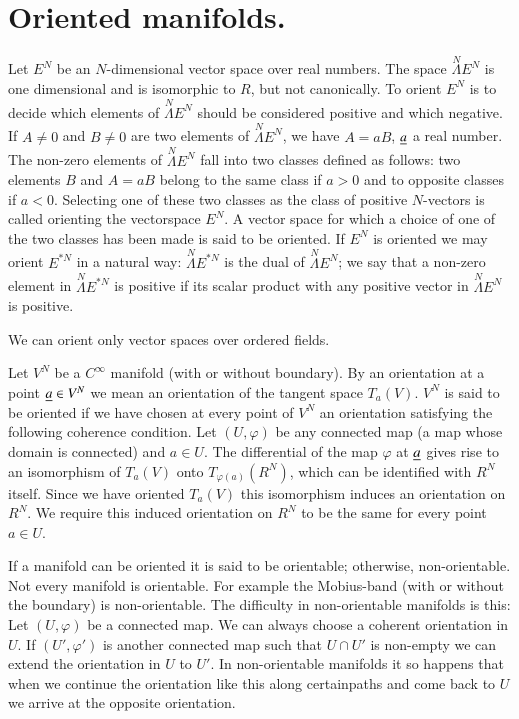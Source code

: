 \section*{Oriented manifolds.}

Let $E^{N}$ be an $N$-dimensional vector space over real numbers. The
space $\overset{N}{\Lambda}E^{N}$ is one dimensional and is isomorphic
to $R$, but not canonically. To orient $E^{N}$ is to decide which
elements of $\overset{N}{\Lambda}E^{N}$ should be considered positive
and which negative. If $A\neq 0$ and $B\neq 0$ are two elements of
$\overset{N}{\Lambda}E^{N}$, we have $A=aB$, $\underline{a}$ a real
number. The non-zero elements of $\overset{N}{\Lambda}E^{N}$ fall into
two classes defined as follows: two elements $B$ and $A=aB$ belong to
the same class if $a>0$ and to opposite classes if $a<0$. Selecting
one of these two classes as the class of positive $N$-vectors is
called orienting the vector\pageoriginale space $E^{N}$. A vector
space for which a choice of one of the two classes has been made is
said to be oriented. If $E^{N}$ is oriented we may orient $E^{\ast N}$
in a natural way: $\overset{N}{\Lambda}E^{\ast N}$ is the dual of
$\overset{N}{\Lambda}E^{N}$; we say that a non-zero element in
$\overset{N}{\Lambda}E^{\ast N}$ is positive if its scalar product
with any positive vector in $\overset{N}{\Lambda}E^{N}$ is positive.

We can orient only vector spaces over ordered fields.

Let $V^{N}$ be a $C^{\infty}$ manifold (with or without boundary). By
an orientation at a point $\underline{a}\in V^{N}$ we mean an orientation of
the tangent space $T_{a}(V)$. $V^{N}$ is said to be oriented if we
have chosen at every point of $V^{N}$ an orientation satisfying the
following coherence condition. Let $(U,\varphi)$ be any connected map
(\iec a map whose domain is connected) and $a\in U$. The differential
of the map $\varphi$ at $\underline{a}$ gives rise to an isomorphism of
$T_{a}(V)$ onto $T_{\varphi(a)}(R^{N})$, which can be identified with
$R^{N}$ itself. Since we have oriented $T_{a}(V)$ this isomorphism
induces an orientation on $R^{N}$. We require this induced orientation
on $R^{N}$ to be the same for every point $a\in U$.

If a manifold can be oriented it is said to be orientable; otherwise,
non-orientable. Not every manifold is orientable. For example the
Mobius-band (with or without the boundary) is non-orientable. The
difficulty in non-orientable manifolds is this: Let $(U,\varphi)$ be a
connected map. We can always choose a coherent orientation in $U$. If
$(U',\varphi')$ is another connected map such that $U\cap U'$ is
non-empty we can extend the orientation in $U$ to $U'$. In
non-orientable manifolds it so happens that when we continue the
orientation like this along certain\pageoriginale paths and come back
to $U$ we arrive at the opposite orientation.

